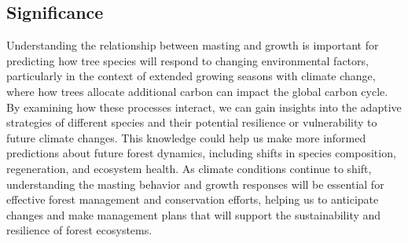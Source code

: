 \documentclass[11pt,letter]{article}
\begin{document}
\subsection{Significance}
Understanding the relationship between masting and growth is important for predicting how tree species will respond to changing environmental factors, particularly in the context of extended growing seasons with climate change, where how trees allocate additional carbon can impact the global carbon cycle. By examining how these processes interact, we can gain insights into the adaptive strategies of different species and their potential resilience or vulnerability to future climate changes. This knowledge could help us make more informed predictions about future forest dynamics, including shifts in species composition, regeneration, and ecosystem health. As climate conditions continue to shift, understanding the  masting behavior and growth responses will be essential for effective forest management and conservation efforts, helping us to anticipate changes and make management plans that will support the sustainability and resilience of forest ecosystems.
\end{document}
